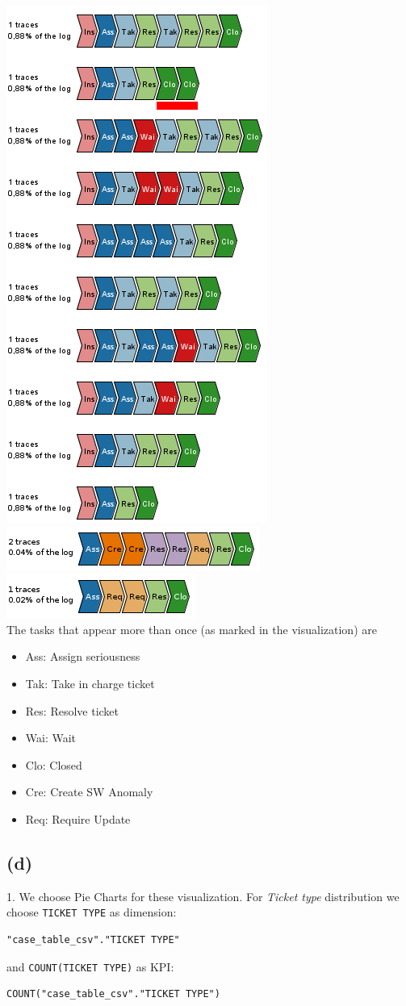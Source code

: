 \documentclass[../../main.tex]{subfiles}
\begin{document}
\includegraphics[width=0.5\columnwidth]{img/ProM_c_traces_2.png}\\
\includegraphics[width=0.5\columnwidth]{img/ProM_c_traces_Cre.png}
\includegraphics[width=0.5\columnwidth]{img/ProM_c_traces_Req.png}\\
The tasks that appear more than once (as marked in the visualization) are
\begin{itemize}
\item Ass: Assign seriousness
\item Tak: Take in charge ticket
\item Res: Resolve ticket
\item Wai: Wait
\item Clo: Closed
\item Cre: Create SW Anomaly
\item Req: Require Update
\end{itemize}


\subsection*{(d)}
1. We choose Pie Charts for these visualization. For \textit{Ticket type} distribution we choose \texttt{TICKET TYPE} as dimension:
\begin{verbatim}
"case_table_csv"."TICKET TYPE"
\end{verbatim}
and \texttt{COUNT(TICKET TYPE)} as KPI:
\begin{verbatim}
COUNT("case_table_csv"."TICKET TYPE")
\end{verbatim}
\end{document}
